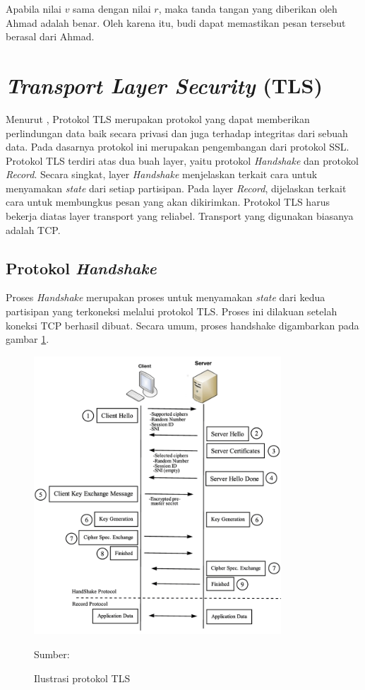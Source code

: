 Apabila nilai $v$ sama dengan nilai $r$, maka tanda tangan yang diberikan oleh Ahmad adalah benar. Oleh karena itu, budi dapat memastikan pesan tersebut berasal dari Ahmad.

\section{\emph{Transport Layer Security} (TLS)}
\label{sec:tls}

Menurut \textcite{rfc5246}, Protokol TLS merupakan protokol yang dapat memberikan perlindungan data baik secara privasi dan juga terhadap integritas dari sebuah data. Pada dasarnya protokol ini merupakan pengembangan dari protokol SSL. Protokol TLS terdiri atas dua buah layer, yaitu protokol \emph{Handshake} dan protokol \emph{Record}. Secara singkat, layer \emph{Handshake} menjelaskan terkait cara untuk menyamakan \emph{state} dari setiap partisipan. Pada layer \emph{Record}, dijelaskan terkait cara untuk membungkus pesan yang akan dikirimkan. Protokol TLS harus bekerja diatas layer transport yang reliabel. Transport yang digunakan biasanya adalah TCP.

\subsection{Protokol \emph{Handshake}}
\label{sec:tls.handshake}

Proses \emph{Handshake} merupakan proses untuk menyamakan \emph{state} dari kedua partisipan yang terkoneksi melalui protokol TLS. Proses ini dilakuan setelah koneksi TCP berhasil dibuat. Secara umum, proses handshake
digambarkan pada gambar \ref{fig:tls.handshake}.

\begin{figure}[!h]
  \centering
  \includegraphics[width=350px]{chapters/res/chapter-2/img/tls.protocol.png}
  \caption{Ilustrasi protokol TLS} \label{fig:tls.handshake}
  Sumber: \textcite{shbair2016}
\end{figure}

